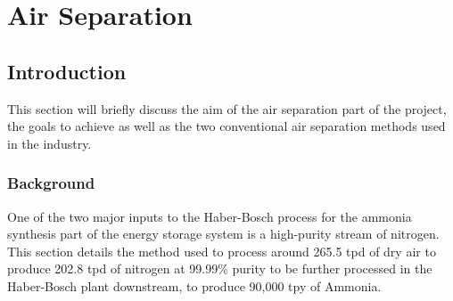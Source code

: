 %

\section{Air Separation}

\subsection{Introduction} \noindent
This section will briefly discuss the aim of the air separation part of the project, the goals to achieve as well as the two conventional air separation methods used in the industry.
	\subsubsection{Background}  \noindent
    One of the two major inputs to the Haber-Bosch process for the ammonia synthesis part of the energy storage system is a high-purity stream of nitrogen. This section details the method used to process around 265.5 tpd of dry air to produce 202.8 tpd of nitrogen at 99.99\% purity to be further processed in the Haber-Bosch plant downstream, to produce 90,000 tpy of Ammonia.
